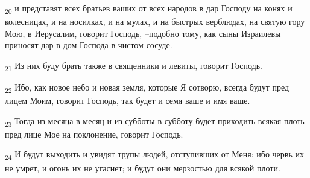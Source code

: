 \begin{tcolorbox}
\textsubscript{20} и представят всех братьев ваших от всех народов в дар Господу на конях и колесницах, и на носилках, и на мулах, и на быстрых верблюдах, на святую гору Мою, в Иерусалим, говорит Господь, --подобно тому, как сыны Израилевы приносят дар в дом Господа в чистом сосуде.
\end{tcolorbox}
\begin{tcolorbox}
\textsubscript{21} Из них буду брать также в священники и левиты, говорит Господь.
\end{tcolorbox}
\begin{tcolorbox}
\textsubscript{22} Ибо, как новое небо и новая земля, которые Я сотворю, всегда будут пред лицем Моим, говорит Господь, так будет и семя ваше и имя ваше.
\end{tcolorbox}
\begin{tcolorbox}
\textsubscript{23} Тогда из месяца в месяц и из субботы в субботу будет приходить всякая плоть пред лице Мое на поклонение, говорит Господь.
\end{tcolorbox}
\begin{tcolorbox}
\textsubscript{24} И будут выходить и увидят трупы людей, отступивших от Меня: ибо червь их не умрет, и огонь их не угаснет; и будут они мерзостью для всякой плоти.
\end{tcolorbox}
